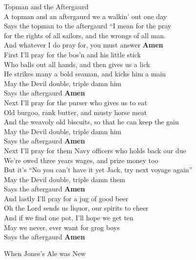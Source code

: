 \documentclass[letterpaper,9pt]{article}
\begin{document}
\newpage
{}
\Huge
Topman and the Aftergaurd\\

\LARGE
A topman and an aftergaurd we a walkin' out one day \\
Says the topman to the aftergaurd “I mean for the pray \\
for the rights of all sailors, and the wrongs of all man. \\
And whatever I do pray for, you must answer \textbf{Amen} \\

First I'll pray for the bos'n and his little stick \\
Who balls out all hands, and then gives us a lick \\
He strikes many a bold seaman, and kicks him a main \\
May the Devil double, triple damn him \\
Says the aftergaurd \textbf{Amen} \\

Next I'll pray for the purser who gives us to eat \\
Old burgoo, rank butter, and musty horse meat \\
And the weavoly old biscuits, so that he can keep the gain \\
May the Devil double, triple damn him \\
Says the aftergaurd \textbf{Amen} \\

Next I'll pray for them Navy officers who holds back our due \\
We're owed three years wages, and prize money too \\
But it's “No you can't have it yet Jack, try next voyage again” \\
May the Devil double, triple damn them \\
Says the aftergaurd \textbf{Amen} \\

And lastly I'll pray for a jug of good beer \\
Oh the Lord sends us liquor, our spirits to cheer \\
And if we find one pot, I'll hope we get ten \\
May we never, ever want for grog boys \\
Says the aftergaurd \textbf{Amen} \\

\newpage
{}
\huge
When Jones's Ale was New \\
\end{document}
